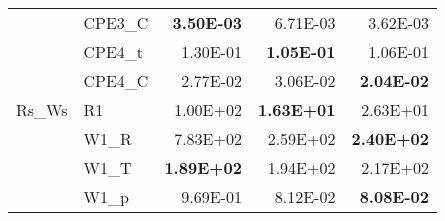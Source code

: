 \begin{tabular}{llrrr}
                     &     CPE3\_C  & \textbf{3.50E-03} & 6.71E-03 & 3.62E-03\\
                     &     CPE4\_t  & 1.30E-01 & \textbf{1.05E-01} & 1.06E-01\\
                     &     CPE4\_C  & 2.77E-02 & 3.06E-02 & \textbf{2.04E-02}\\
              Rs\_Ws  &         R1  & 1.00E+02 & \textbf{1.63E+01} & 2.63E+01\\
                     &       W1\_R  & 7.83E+02 & 2.59E+02 & \textbf{2.40E+02}\\
                     &       W1\_T  & \textbf{1.89E+02} & 1.94E+02 & 2.17E+02\\
                     &       W1\_p  & 9.69E-01 & 8.12E-02 & \textbf{8.08E-02}\\
\bottomrule
\end{tabular}
